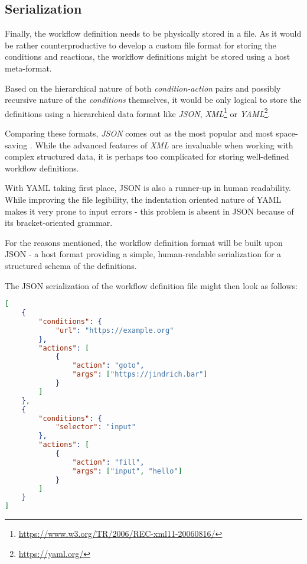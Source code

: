 \subsection{Serialization}


Finally, the workflow definition needs to be physically stored in a file. 
As it would be rather counterproductive to develop a custom file format for storing the conditions and reactions, the workflow definitions might be stored using a host meta-format.

Based on the hierarchical nature of both \textit{condition-action} pairs and possibly recursive nature of the \textit{conditions} themselves, it would be only logical to store the definitions 
using a hierarchical data format like \textit{JSON}, \textit{XML}\footnote{\href{https://www.w3.org/TR/2006/REC-xml11-20060816/}{https://www.w3.org/TR/2006/REC-xml11-20060816/}} or \textit{YAML}\footnote{\href{https://yaml.org/}{https://yaml.org/}}.

Comparing these formats, \textit{JSON} comes out as the most popular  and most space-saving . 
While the advanced features of \textit{XML} are invaluable when working with complex structured data, it is perhaps too complicated for storing well-defined workflow definitions.

With YAML taking first place, JSON is also a runner-up in human readability.
While improving the file legibility, the indentation oriented nature of YAML makes it very prone to input errors - this problem is absent in JSON because of its bracket-oriented grammar.

For the reasons mentioned, the workflow definition format will be built upon JSON - a host format providing a simple, human-readable serialization for a structured schema of the definitions.

The JSON serialization of the workflow definition file might then look as follows:

\emptyline

\begin{minipage}{0.95\linewidth}
\begin{lstlisting}[language=json, columns=spaceflexible]
[
    {
        "conditions": {
            "url": "https://example.org"
        },
        "actions": [
            {
                "action": "goto",
                "args": ["https://jindrich.bar"]
            }
        ]
    },
    {
        "conditions": {
            "selector": "input"
        },
        "actions": [
            {
                "action": "fill",
                "args": ["input", "hello"]
            }
        ]
    }
]
\end{lstlisting}
\end{minipage}

